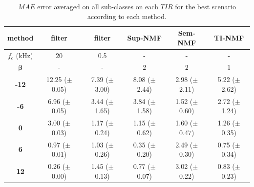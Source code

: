 \documentclass[twocolumn]{svjour3}          %
\begin{document}
\begin{table}[t]
\centering
\caption{$MAE$ error averaged on all sub-classes on each $TIR$ for the best scenario according to each method.}
\begin{tabular}{@{}cccccc@{}}
\toprule
\textbf{method} & filter & filter & Sup-NMF & Sem-NMF & TI-NMF \\ \midrule
$f_c$ (kHz) & 20 & 0.5 & - & - & - \\
$\mathbf{\beta}$ & - & - & 2 & 2 & 1 \\ \hline
\textbf{-12} & 12.25 ($\pm$ 0.05) & 7.39 ($\pm$ 3.00) & 8.08 ($\pm$ 2.44) & 2.98 ($\pm$ 2.11) & 5.22 ($\pm$ 2.62) \\
\textbf{-6} & 6.96 ($\pm$ 0.05) & 3.44 ($\pm$ 1.65) & 3.84 ($\pm$ 1.58) & 1.52 ($\pm$ 0.60)  & 2.72 ($\pm$ 1.24) \\
\textbf{0} & 3.00 ($\pm$ 0.03) & 1.17 ($\pm$ 0.24) & 1.15 ($\pm$ 0.62) & 1.60 ($\pm$ 0.47) & 1.26 ($\pm$ 0.35) \\
\textbf{6} & 0.97 ($\pm$ 0.01) & 1.03 ($\pm$ 0.26) & 0.35 ($\pm$ 0.20) & 2.49 ($\pm$ 0.30) & 0.75 ($\pm$ 0.34) \\
\textbf{12} & 0.26 ($\pm$ 0.00) & 1.45 ($\pm$ 0.13) & 0.77 ($\pm$ 0.07) & 3.02 ($\pm$0.22) & 0.83 ($\pm$ 0.23) \\ \bottomrule
\end{tabular}
\label{tab:results_TIR}
\end{table}
\end{document}
